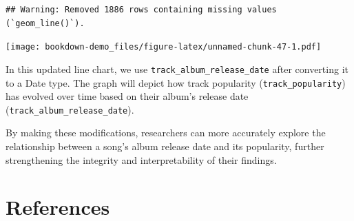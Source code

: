\documentclass[
  b5paper]{book}
\begin{document}
\begin{verbatim}
## Warning: Removed 1886 rows containing missing values (`geom_line()`).
\end{verbatim}

\texttt{[image: bookdown-demo\_files/figure-latex/unnamed-chunk-47-1.pdf]}

In this updated line chart, we use \texttt{track\_album\_release\_date} after converting it to a Date type. The graph will depict how track popularity (\texttt{track\_popularity}) has evolved over time based on their album's release date (\texttt{track\_album\_release\_date}).

By making these modifications, researchers can more accurately explore the relationship between a song's album release date and its popularity, further strengthening the integrity and interpretability of their findings.

\hypertarget{references-4}{%
\section{References}\label{references-4}}
\end{document}
